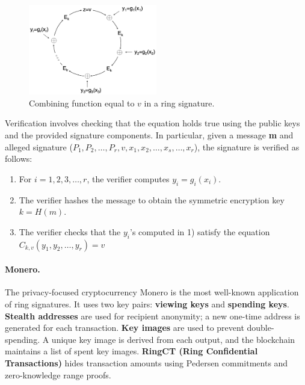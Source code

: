 \begin{figure}
	\begin{center}
		\includegraphics[width=0.5\textwidth]{./figs/ring2.png}
		\caption{Combining function equal to $v$ in a ring signature.}		
		\label{fig:ring2}
	\end{center}	
\end{figure}

Verification involves checking that the equation holds true using the
public keys and the provided signature components.
In particular, given a message \textbf{m} and alleged signature ($P_1, P_2, \ldots, P_r, v, x_1, x_2, \ldots, x_s, \ldots, x_r$), the signature is verified as follows:

\begin{enumerate}
	\item For $i = 1,2,3, \ldots, r$, the verifier computes $y_i = g_i (x_i)$.
	
	\item The verifier hashes the message to obtain the symmetric encryption key $k = H(m)$.
	
	\item The verifier checks that the $y_i$’s computed in 1) satisfy the equation $C_{k,v}(y_1, y_2, …, y_r) = v$
	
\end{enumerate}
	



\paragraph{Monero.}\label{monero}
The privacy-focused cryptocurrency Monero is the most well-known
application of ring signatures. 
It uses two key pairs: \textbf{viewing
keys} and \textbf{spending keys}. \textbf{Stealth addresses} are used
for recipient anonymity; a new one-time address is generated for each
transaction. \textbf{Key images} are used to prevent double-spending.
A unique key image is derived from each output, and the blockchain
maintains a list of spent key images. \textbf{RingCT (Ring
Confidential Transactions)} hides transaction amounts using Pedersen
commitments and zero-knowledge range proofs.



